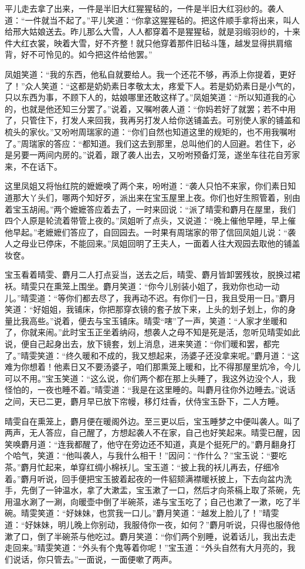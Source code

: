 \documentclass[12pt,oneside]{book}
\begin{document}
平儿走去拿了出来，一件是半旧大红猩猩毡的，一件是半旧大红羽纱的。袭人道：“一件就当不起了。”平儿笑道：“你拿这猩猩毡的。把这件顺手拿将出来，叫人给邢大姑娘送去。昨儿那么大雪，人人都穿着不是猩猩毡，就是羽缎羽纱的，十来件大红衣裳，映着大雪，好不齐整！就只他穿着那件旧毡斗篷，越发显得拱肩缩背，好不可怜见的。如今把这件给他罢。”

凤姐笑道：“我的东西，他私自就要给人。我一个还花不够，再添上你提着，更好了！”众人笑道：“这都是奶奶素日孝敬太太，疼爱下人。若是奶奶素日是小气的，只以东西为事，不顾下人的，姑娘哪里还敢这样了。”凤姐笑道：“所以知道我的心的，也就是他还知三分罢了。”说着，又嘱咐袭人道：“你妈若好了就罢；若不中用了，只管住下，打发人来回我，我再另打发人给你送铺盖去。可别使人家的铺盖和梳头的家伙。”又吩咐周瑞家的道：“你们自然也知道这里的规矩的，也不用我嘱咐了。”周瑞家的答应：“都知道。我们这去到那里，总叫他们的人回避。若住下，必是另要一两间内房的。”说着，跟了袭人出去，又吩咐预备灯笼，遂坐车往花自芳家来，不在话下。

这里凤姐又将怡红院的嬷嬷唤了两个来，吩咐道：“袭人只怕不来家，你们素日知道那大丫头们，哪两个知好歹，派出来在宝玉屋里上夜。你们也好生照管着，别由着宝玉胡闹。”两个嬷嬷答应着去了，一时来回说：“派了晴雯和麝月在屋里，我们四个人原是轮流着带管上夜的。”凤姐听了点头，又说道：“晚上催他早睡，早上催他早起。”老嬷嬷们答应了，自回园去。一时果有周瑞家的带了信回凤姐儿说：“袭人之母业已停床，不能回来。”凤姐回明了王夫人，一面着人往大观园去取他的铺盖妆奁。

宝玉看着晴雯、麝月二人打点妥当，送去之后，晴雯、麝月皆卸罢残妆，脱换过裙袄。晴雯只在熏笼上围坐。麝月笑道：“你今儿别装小姐了，我劝你也动一动儿。”晴雯道：“等你们都去尽了，我再动不迟。有你们一日，我且受用一日。”麝月笑道：“好姐姐，我铺床，你把那穿衣镜的套子放下来，上头的划子划上，你的身量比我高些。”说着，便去与宝玉铺床。晴雯“嗐”了一声，笑道：“人家才坐暖和了，你就来闹。”此时宝玉正坐着纳闷，想袭人之母不知是死是活，忽听见晴雯如此说，便自己起身出去，放下镜套，划上消息，进来笑道：“你们暖和罢，都完了。”晴雯笑道：“终久暖和不成的，我又想起来，汤婆子还没拿来呢。”麝月道：“这难为你想着！他素日又不要汤婆子，咱们那熏笼上暖和，比不得那屋里炕冷，今儿可以不用。”宝玉笑道：“这么说，你们两个都在那上头睡了，我这外边没个人，我怪怕的，一夜也睡不着。”晴雯道：“我是在这里睡的。叫麝月往你外边睡去。”说话之间，天已二更，麝月早已放下帘幔，移灯炷香，伏侍宝玉卧下，二人方睡。

晴雯自在熏笼上，麝月便在暖阁外边。至三更以后，宝玉睡梦之中便叫袭人。叫了两声，无人答应，自己醒了，方想起袭人不在家，自己也好笑起来。晴雯已醒，因笑唤麝月道：“连我都醒了，他守在旁边还不知道，真是个挺死尸的。”麝月翻身打个哈气，笑道：“他叫袭人，与我什么相干！”因问：“作什么？”宝玉说：“要吃茶。”麝月忙起来，单穿红绸小棉袄儿。宝玉道：“披上我的袄儿再去，仔细冷着。”麝月听说，回手便把宝玉披着起夜的一件貂颏满襟暖袄披上，下去向盆内洗手，先倒了一钟温水，拿了大漱盂，宝玉漱了一口，然后才向茶槅上取了茶碗，先用温水涮了一涮，向暖壶中倒了半碗茶，递与宝玉吃了；自己也漱了一漱，吃了半碗。晴雯笑道：“好妹妹，也赏我一口儿。”麝月笑道：“越发上脸儿了！”晴雯道：“好妹妹，明儿晚上你别动，我服侍你一夜，如何？”麝月听说，只得也服侍他漱了口，倒了半碗茶与他吃过。麝月笑道：“你们两个别睡，说着话儿，我出去走走回来。”晴雯笑道：“外头有个鬼等着你呢！”宝玉道：“外头自然有大月亮的，我们说话，你只管去。”一面说，一面便嗽了两声。
\end{document}
